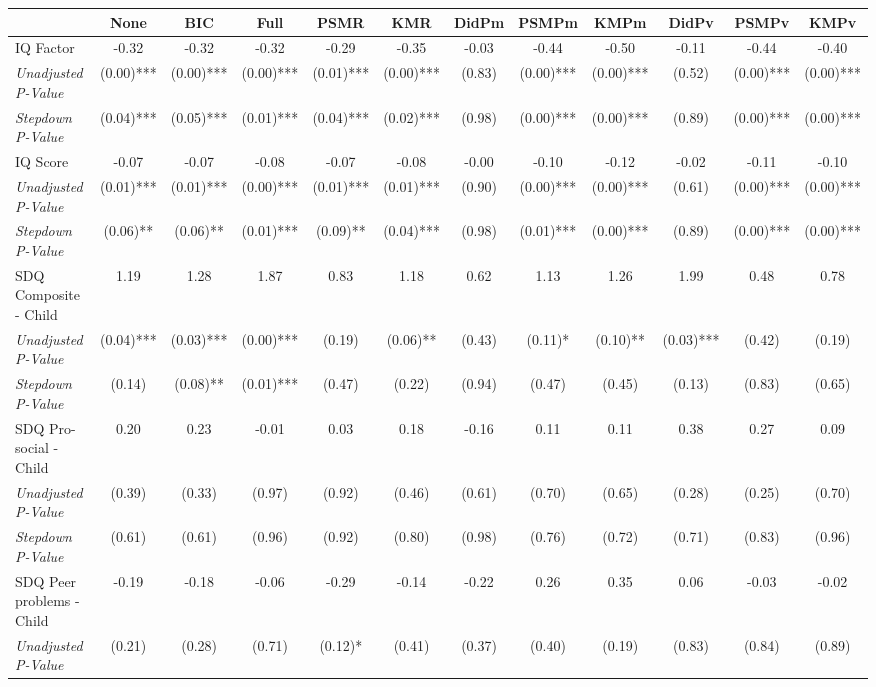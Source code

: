 \begin{tabular}{l c c c c c c c c c c c}
\toprule
 & None & BIC & Full & PSMR & KMR & DidPm & PSMPm & KMPm & DidPv & PSMPv & KMPv \\
\midrule
IQ Factor & -0.32 & -0.32 & -0.32 & -0.29 & -0.35 & -0.03 & -0.44 & -0.50 & -0.11 & -0.44 & -0.40 \\
\quad \textit{Unadjusted P-Value} & (0.00)*** & (0.00)*** & (0.00)*** & (0.01)*** & (0.00)*** & (0.83) & (0.00)*** & (0.00)*** & (0.52) & (0.00)*** & (0.00)*** \\
\quad \textit{Stepdown P-Value} & (0.04)*** & (0.05)*** & (0.01)*** & (0.04)*** & (0.02)*** & (0.98) & (0.00)*** & (0.00)*** & (0.89) & (0.00)*** & (0.00)*** \\
IQ Score & -0.07 & -0.07 & -0.08 & -0.07 & -0.08 & -0.00 & -0.10 & -0.12 & -0.02 & -0.11 & -0.10 \\
\quad \textit{Unadjusted P-Value} & (0.01)*** & (0.01)*** & (0.00)*** & (0.01)*** & (0.01)*** & (0.90) & (0.00)*** & (0.00)*** & (0.61) & (0.00)*** & (0.00)*** \\
\quad \textit{Stepdown P-Value} & (0.06)** & (0.06)** & (0.01)*** & (0.09)** & (0.04)*** & (0.98) & (0.01)*** & (0.00)*** & (0.89) & (0.00)*** & (0.00)*** \\
SDQ Composite - Child & 1.19 & 1.28 & 1.87 & 0.83 & 1.18 & 0.62 & 1.13 & 1.26 & 1.99 & 0.48 & 0.78 \\
\quad \textit{Unadjusted P-Value} & (0.04)*** & (0.03)*** & (0.00)*** & (0.19) & (0.06)** & (0.43) & (0.11)* & (0.10)** & (0.03)*** & (0.42) & (0.19) \\
\quad \textit{Stepdown P-Value} & (0.14) & (0.08)** & (0.01)*** & (0.47) & (0.22) & (0.94) & (0.47) & (0.45) & (0.13) & (0.83) & (0.65) \\
SDQ Pro-social - Child & 0.20 & 0.23 & -0.01 & 0.03 & 0.18 & -0.16 & 0.11 & 0.11 & 0.38 & 0.27 & 0.09 \\
\quad \textit{Unadjusted P-Value} & (0.39) & (0.33) & (0.97) & (0.92) & (0.46) & (0.61) & (0.70) & (0.65) & (0.28) & (0.25) & (0.70) \\
\quad \textit{Stepdown P-Value} & (0.61) & (0.61) & (0.96) & (0.92) & (0.80) & (0.98) & (0.76) & (0.72) & (0.71) & (0.83) & (0.96) \\
SDQ Peer problems - Child & -0.19 & -0.18 & -0.06 & -0.29 & -0.14 & -0.22 & 0.26 & 0.35 & 0.06 & -0.03 & -0.02 \\
\quad \textit{Unadjusted P-Value} & (0.21) & (0.28) & (0.71) & (0.12)* & (0.41) & (0.37) & (0.40) & (0.19) & (0.83) & (0.84) & (0.89) \\

\end{tabular}
